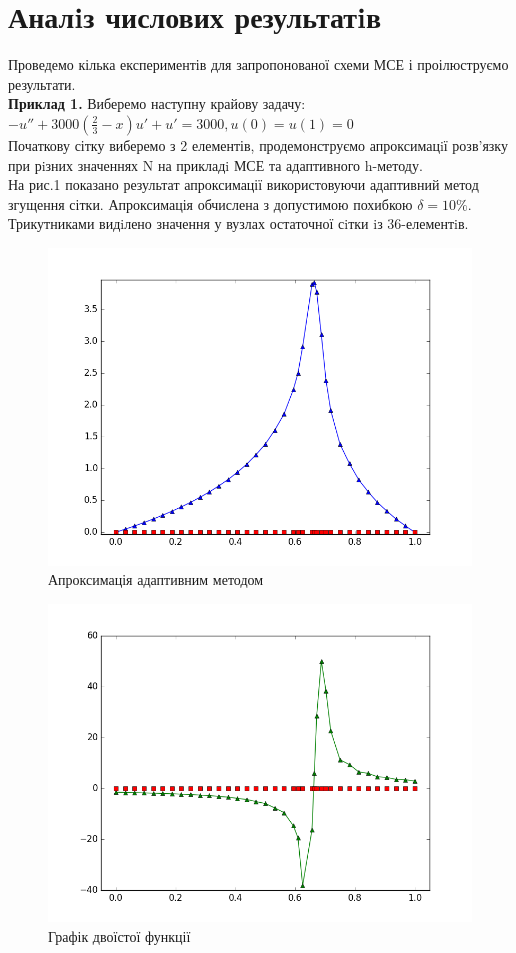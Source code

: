 \documentclass[a4paper]{article}
\numberwithin{equation}{section}
\begin{document}
\section{Аналiз числових результатiв}
Проведемо кілька експериментів для запропонованої схеми МСЕ і проілюструємо результати.\\
\textbf{Приклад 1.} Виберемо наступну крайову задачу:
$-u'' + 3000(\frac{2}{3} - x)u' + u'=3000, u(0)=u(1)=0$\\
Початкову сітку виберемо з 2 елементів, продемонструємо апроксимацiї розв’язку при рiзних значен\-нях N на прикладi МСЕ та адаптивного h-методу.\\
На рис.1 показано результат апроксимації використовуючи адаптивний метод згущення сітки. Апроксимація обчислена з допустимою похибкою $\delta=10\%$. Трикутниками видiлено значення у вузлах остаточної сiтки iз 36-елементiв.
\begin{figure}[H]
\includegraphics[width=\textwidth]{figure_3.png}
\caption{Апроксимація адаптивним методом}
\end{figure}
\begin{figure}[H]
\includegraphics[width=\textwidth]{figure_4.png}
\caption{Графік двоїстої функції}
\end{figure}
\end{document}
